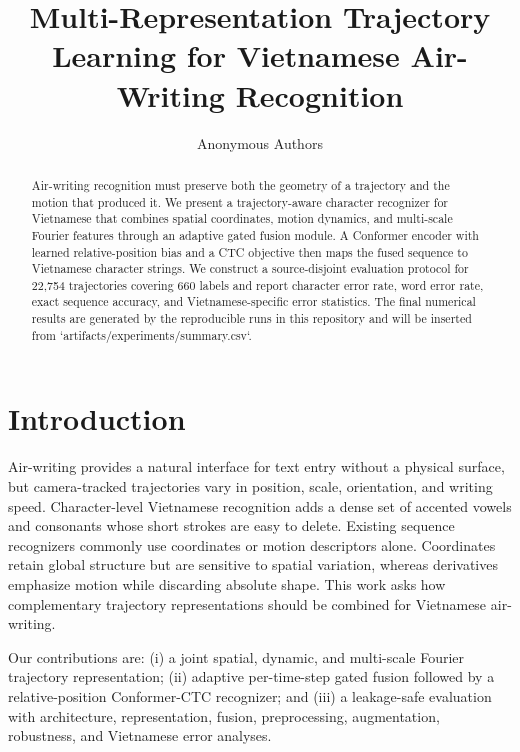 \documentclass[runningheads]{llncs}
\title{Multi-Representation Trajectory Learning for Vietnamese Air-Writing Recognition}
\author{Anonymous Authors}
\institute{Anonymous Institution}
\begin{document}
\maketitle

\begin{abstract}
Air-writing recognition must preserve both the geometry of a trajectory and
the motion that produced it. We present a trajectory-aware character
recognizer for Vietnamese that combines spatial coordinates, motion dynamics,
and multi-scale Fourier features through an adaptive gated fusion module. A
Conformer encoder with learned relative-position bias and a CTC objective then
maps the fused sequence to Vietnamese character strings. We construct a
source-disjoint evaluation protocol for 22,754 trajectories covering 660
labels and report character error rate, word error rate, exact sequence
accuracy, and Vietnamese-specific error statistics. The final numerical
results are generated by the reproducible runs in this repository and will be
inserted from `artifacts/experiments/summary.csv`.
\end{abstract}

\section{Introduction}
Air-writing provides a natural interface for text entry without a physical
surface, but camera-tracked trajectories vary in position, scale, orientation,
and writing speed. Character-level Vietnamese recognition adds a dense set of
accented vowels and consonants whose short strokes are easy to delete.
Existing sequence recognizers commonly use coordinates or motion descriptors
alone. Coordinates retain global structure but are sensitive to spatial
variation, whereas derivatives emphasize motion while discarding absolute
shape. This work asks how complementary trajectory representations should be
combined for Vietnamese air-writing.

Our contributions are: (i) a joint spatial, dynamic, and multi-scale Fourier
trajectory representation; (ii) adaptive per-time-step gated fusion followed
by a relative-position Conformer-CTC recognizer; and (iii) a leakage-safe
evaluation with architecture, representation, fusion, preprocessing,
augmentation, robustness, and Vietnamese error analyses.
\end{document}
